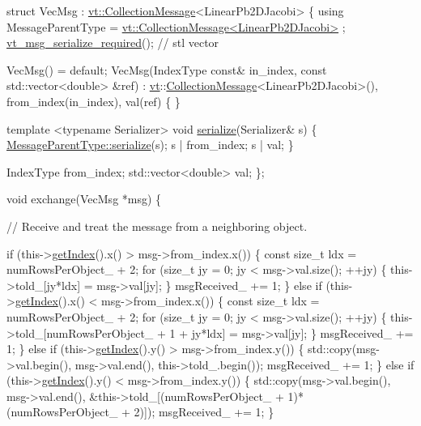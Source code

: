 \begin{DoxyCodeInclude}
  \textcolor{keyword}{struct }VecMsg : \hyperlink{structvt_1_1vrt_1_1collection_1_1_collection_message}{vt::CollectionMessage}<LinearPb2DJacobi> \{
    \textcolor{keyword}{using} MessageParentType = \hyperlink{structvt_1_1vrt_1_1collection_1_1_collection_message}{vt::CollectionMessage<LinearPb2DJacobi>}
      ;
    \hyperlink{message__serialize_8h_a54128d5338aaa9c918179826085e13d1}{vt\_msg\_serialize\_required}(); \textcolor{comment}{// stl vector}

    VecMsg() = \textcolor{keywordflow}{default};
    VecMsg(IndexType \textcolor{keyword}{const}& in\_index, \textcolor{keyword}{const} std::vector<double> &ref) :
      \hyperlink{namespacevt}{vt}::\hyperlink{namespacevt_ae7700e12f79c0fec16964aab84838428}{CollectionMessage}<LinearPb2DJacobi>(),
      from\_index(in\_index), val(ref)
    \{ \}

    \textcolor{keyword}{template} <\textcolor{keyword}{typename} Serializer>
    \textcolor{keywordtype}{void} \hyperlink{namespacecheckpoint_a075da4e7344cf037943362517e606c3a}{serialize}(Serializer& s) \{
      \hyperlink{namespacecheckpoint_a075da4e7344cf037943362517e606c3a}{MessageParentType::serialize}(s);
      s | from\_index;
      s | val;
    \}

    IndexType from\_index;
    std::vector<double> val;
  \};

  \textcolor{keywordtype}{void} exchange(VecMsg *msg) \{

    \textcolor{comment}{// Receive and treat the message from a neighboring object.}

    \textcolor{keywordflow}{if} (this->\hyperlink{namespacecheckpoint_1_1dispatch_1_1typeregistry_aa75ef84e9b63a687784360ded2d56fe4}{getIndex}().x() > msg->from\_index.x()) \{
      \textcolor{keyword}{const} \textcolor{keywordtype}{size\_t} ldx = numRowsPerObject\_ + 2;
      \textcolor{keywordflow}{for} (\textcolor{keywordtype}{size\_t} jy = 0; jy < msg->val.size(); ++jy) \{
        this->told\_[jy*ldx] = msg->val[jy];
      \}
      msgReceived\_ += 1;
    \}
    \textcolor{keywordflow}{else} \textcolor{keywordflow}{if} (this->\hyperlink{namespacecheckpoint_1_1dispatch_1_1typeregistry_aa75ef84e9b63a687784360ded2d56fe4}{getIndex}().x() < msg->from\_index.x()) \{
      \textcolor{keyword}{const} \textcolor{keywordtype}{size\_t} ldx = numRowsPerObject\_ + 2;
      \textcolor{keywordflow}{for} (\textcolor{keywordtype}{size\_t} jy = 0; jy < msg->val.size(); ++jy) \{
        this->told\_[numRowsPerObject\_ + 1 + jy*ldx] = msg->val[jy];
      \}
      msgReceived\_ += 1;
    \}
    \textcolor{keywordflow}{else} \textcolor{keywordflow}{if} (this->\hyperlink{namespacecheckpoint_1_1dispatch_1_1typeregistry_aa75ef84e9b63a687784360ded2d56fe4}{getIndex}().y() > msg->from\_index.y()) \{
      std::copy(msg->val.begin(), msg->val.end(), this->told\_.begin());
      msgReceived\_ += 1;
    \}
    \textcolor{keywordflow}{else} \textcolor{keywordflow}{if} (this->\hyperlink{namespacecheckpoint_1_1dispatch_1_1typeregistry_aa75ef84e9b63a687784360ded2d56fe4}{getIndex}().y() < msg->from\_index.y()) \{
      std::copy(msg->val.begin(), msg->val.end(),
                &this->told\_[(numRowsPerObject\_ + 1)*(numRowsPerObject\_ + 2)]);
      msgReceived\_ += 1;
    \}


\end{DoxyCodeInclude}
